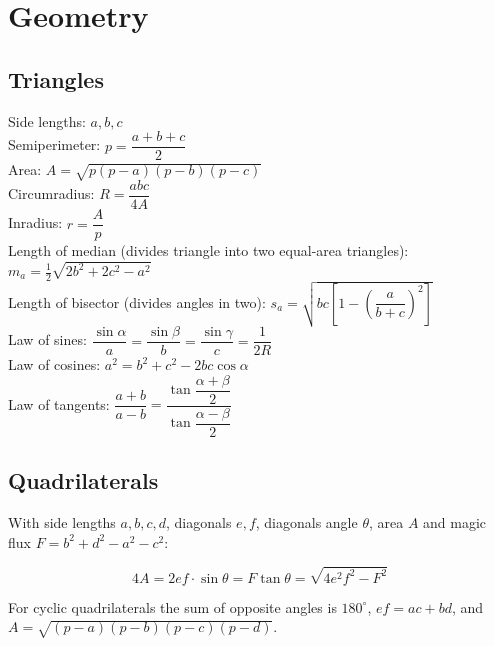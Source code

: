 \section{Geometry}

\subsection{Triangles}
Side lengths: $a,b,c$\\
Semiperimeter: $p=\dfrac{a+b+c}{2}$\\
Area: $A=\sqrt{p(p-a)(p-b)(p-c)}$\\
Circumradius: $R=\dfrac{abc}{4A}$\\
Inradius: $r=\dfrac{A}{p}$\\
Length of median (divides triangle into two equal-area triangles): $m_a=\tfrac{1}{2}\sqrt{2b^2+2c^2-a^2}$\\
Length of bisector (divides angles in two): $s_a=\sqrt{bc\left[1-\left(\dfrac{a}{b+c}\right)^2\right]}$\\
Law of sines: $\dfrac{\sin\alpha}{a}=\dfrac{\sin\beta}{b}=\dfrac{\sin\gamma}{c}=\dfrac{1}{2R}$\\
Law of cosines: $a^2=b^2+c^2-2bc\cos\alpha$\\
Law of tangents: $\dfrac{a+b}{a-b}=\dfrac{\tan\dfrac{\alpha+\beta}{2}}{\tan\dfrac{\alpha-\beta}{2}}$\\

\subsection{Quadrilaterals}
With side lengths $a,b,c,d$, diagonals $e, f$, diagonals angle $\theta$, area $A$ and
magic flux $F=b^2+d^2-a^2-c^2$:

\[ 4A = 2ef \cdot \sin\theta = F\tan\theta = \sqrt{4e^2f^2-F^2} \]

 For cyclic quadrilaterals the sum of opposite angles is $180^\circ$,
$ef = ac + bd$, and $A = \sqrt{(p-a)(p-b)(p-c)(p-d)}$.


